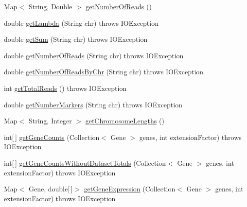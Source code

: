 \begin{DoxyCompactItemize}
\item 
Map$<$ String, Double $>$ \hyperlink{classbroad_1_1pda_1_1seq_1_1segmentation_1_1_alignment_data_model_stats_a961d4d29021dcee878de7c9641b3f6a3}{get\+Number\+Of\+Reads} ()
\item 
double \hyperlink{classbroad_1_1pda_1_1seq_1_1segmentation_1_1_alignment_data_model_stats_a1b29a81c6b1a093d16081d8e362835f0}{get\+Lambda} (String chr)  throws I\+O\+Exception
\item 
double \hyperlink{classbroad_1_1pda_1_1seq_1_1segmentation_1_1_alignment_data_model_stats_a804caa716e6be5b84f785eb80e90e5a9}{get\+Sum} (String chr)  throws I\+O\+Exception
\item 
double \hyperlink{classbroad_1_1pda_1_1seq_1_1segmentation_1_1_alignment_data_model_stats_a1faed5107362119c0586bede50638480}{get\+Number\+Of\+Reads} (String chr)  throws I\+O\+Exception
\item 
double \hyperlink{classbroad_1_1pda_1_1seq_1_1segmentation_1_1_alignment_data_model_stats_a1492aaf55e384cd251aac1339f1a1e08}{get\+Number\+Of\+Reads\+By\+Chr} (String chr)  throws I\+O\+Exception 
\item 
int \hyperlink{classbroad_1_1pda_1_1seq_1_1segmentation_1_1_alignment_data_model_stats_a61ea07f3dae047b5a31ec4f70414aae2}{get\+Total\+Reads} ()  throws I\+O\+Exception 
\item 
double \hyperlink{classbroad_1_1pda_1_1seq_1_1segmentation_1_1_alignment_data_model_stats_afe80f65d9956c7236d1565af5292d86b}{get\+Number\+Markers} (String chr)  throws I\+O\+Exception
\item 
Map$<$ String, Integer $>$ \hyperlink{classbroad_1_1pda_1_1seq_1_1segmentation_1_1_alignment_data_model_stats_a103a170d04336fada8cc29e45352f465}{get\+Chromosome\+Lengths} ()
\item 
int\mbox{[}$\,$\mbox{]} \hyperlink{classbroad_1_1pda_1_1seq_1_1segmentation_1_1_alignment_data_model_stats_a5e1bbaff7cd24dcd934c4ad669a2d6b1}{get\+Gene\+Counts} (Collection$<$ Gene $>$ genes, int extension\+Factor)  throws I\+O\+Exception
\item 
int\mbox{[}$\,$\mbox{]} \hyperlink{classbroad_1_1pda_1_1seq_1_1segmentation_1_1_alignment_data_model_stats_a9e9325efeb3cd65178b97c0bc675229e}{get\+Gene\+Counts\+Without\+Dataset\+Totals} (Collection$<$ Gene $>$ genes, int extension\+Factor)  throws I\+O\+Exception
\item 
Map$<$ Gene, double\mbox{[}$\,$\mbox{]}$>$ \hyperlink{classbroad_1_1pda_1_1seq_1_1segmentation_1_1_alignment_data_model_stats_a5379bafb9acafd7fbb7f7d59ef8c9308}{get\+Gene\+Expression} (Collection$<$ Gene $>$ genes, int extension\+Factor)  throws I\+O\+Exception 

\end{DoxyCompactItemize}
